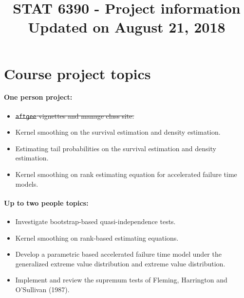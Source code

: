 \documentclass[a4paper,10pt]{article}
\title{STAT 6390 - Project information\\\vspace{.5cm}
\normalsize	Updated on August 21, 2018}
\date{}
\begin{document}
\maketitle
\section*{Course project topics}
\paragraph{One person project:}
\begin{itemize}
\item \sout{\texttt{aftgee} vignettes and manage class site.}
\item Kernel smoothing on the survival estimation and density estimation.
\item Estimating tail probabilities on the survival estimation and density estimation.
\item Kernel smoothing on rank estimating equation for accelerated failure time models.
\end{itemize}
\paragraph{Up to two people topics:}
\begin{itemize}
\item Investigate bootstrap-based quasi-independence tests. 
\item Kernel smoothing on rank-based estimating equations.
\item Develop a parametric based accelerated failure time model under the generalized extreme value distribution and extreme value distribution.
\item Implement and review the supremum tests of Fleming, Harrington and O'Sullivan (1987).
\end{itemize}

\newpage
\end{document}
